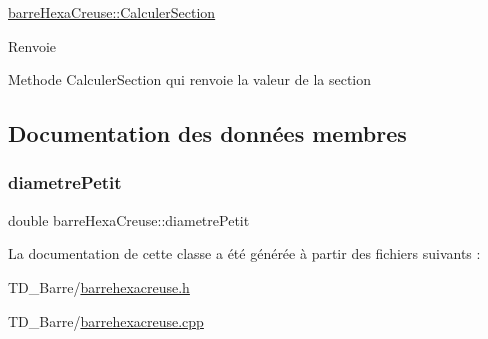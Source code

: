 \hyperlink{classbarre_hexa_creuse_a205ab8a47da16cd0eb63770bcd911b90}{barre\+Hexa\+Creuse\+::\+Calculer\+Section} 

\begin{DoxyReturn}{Renvoie}

\end{DoxyReturn}
Methode Calculer\+Section qui renvoie la valeur de la section 

\subsection{Documentation des données membres}
\mbox{\label{classbarre_hexa_creuse_a9d3319db26ff56f7b27c374535a89a6d}} 
\subsubsection{\texorpdfstring{diametre\+Petit}{diametrePetit}}
{\footnotesize\ttfamily double barre\+Hexa\+Creuse\+::diametre\+Petit\hspace{0.3cm}{\ttfamily [private]}}



La documentation de cette classe a été générée à partir des fichiers suivants \+:\begin{DoxyCompactItemize}
\item 
T\+D\+\_\+\+Barre/\hyperlink{barrehexacreuse_8h}{barrehexacreuse.\+h}\item 
T\+D\+\_\+\+Barre/\hyperlink{barrehexacreuse_8cpp}{barrehexacreuse.\+cpp}\end{DoxyCompactItemize}
